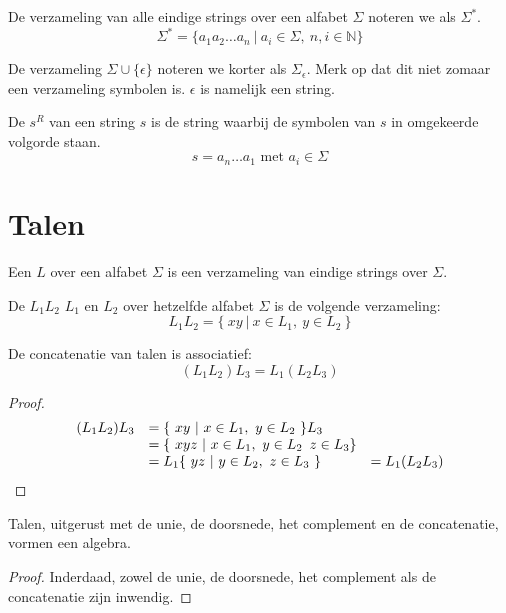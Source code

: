 \documentclass[main.tex]{subfiles}
\begin{document}
\begin{de} 
  De verzameling van alle eindige strings over een alfabet $\Sigma$ noteren we als $\Sigma^{*}$.
  \[ \Sigma^{*} = \{ a_{1}a_{2}\ldots a_{n}\ |\ a_{i}\in \Sigma,\ n,i\in \mathbb{N} \} \]
\end{de}

\begin{de}
  De verzameling $\Sigma \cup \{\epsilon\}$ noteren we korter als $\Sigma_{\epsilon}$.
  Merk op dat dit niet zomaar een verzameling symbolen is. $\epsilon$ is namelijk een string.
\end{de}

\begin{de}
  De  $s^{R}$ van een string $s$ is de string waarbij de symbolen van $s$ in omgekeerde volgorde staan.
  \[ s = a_{n}\ldots a_{1} \text{ met } a_{i} \in \Sigma \]
\end{de}

\section{Talen}
\label{sec:talen}

\begin{de}
  Een  $L$ over een alfabet $\Sigma$ is een verzameling van eindige strings over $\Sigma$.
\end{de}

\begin{de}
  De  $L_1L_2$  $L_1$ en $L_2$ over hetzelfde alfabet $\Sigma$ is de volgende verzameling:
  \[
  L_1L_2 = \{\ xy\ |\ x \in L_1,\ y \in L_2\ \} 
  \]
\end{de}

\begin{ei}
  De concatenatie van talen is associatief:
  \[
  (L_1L_2)L_3 = L_1(L_2L_3)
  \]

  \begin{proof}
    \[
    \begin{array}{r l l}
      (L_1L_2)L_3 &= \{\ xy\ |\ x \in L_1,\ y \in L_2\ \}L_3 &\\
                 &= \{\ xyz\ |\ x \in L_1,\ y \in L_2\,\ z \in L_3\} &\\
                 &= L_1\{\ yz\ |\ y \in L_2,\ z \in L_3\ \} &= L_1(L_2L_3)
    \end{array}
    \]
  \end{proof}
\end{ei}

\begin{ei}
  Talen, uitgerust met de unie, de doorsnede, het complement en de concatenatie, vormen een algebra.
  \begin{proof}
    Inderdaad, zowel de unie, de doorsnede, het complement als de concatenatie zijn inwendig. 
  \end{proof}
\end{ei}
\end{document}
